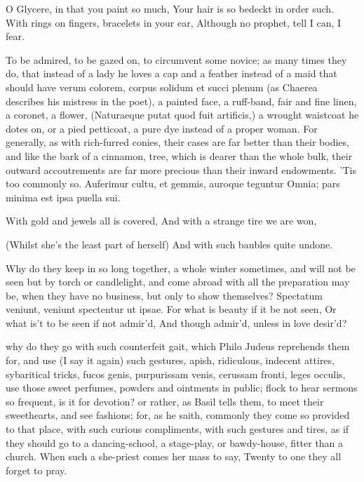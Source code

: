 O Glycere, in that you paint so much,
Your hair is so bedeckt in order such.
With rings on fingers, bracelets in your ear,
Although no prophet, tell I can, I fear.

To be admired, to be gazed on, to circumvent some novice; as many times
they do, that instead of a lady he loves a cap and a feather instead of
a maid that should have verum colorem, corpus solidum et succi plenum
(as Chaerea describes his mistress in the poet), a painted face,
a ruff-band, fair and fine linen, a coronet, a flower,
(Naturaeque putat quod fuit artificis,) a wrought waistcoat he
dotes on, or a pied petticoat, a pure dye instead of a proper woman.
For generally, as with rich-furred conies, their cases are far better
than their bodies, and like the bark of a cinnamon, tree, which is
dearer than the whole bulk, their outward accoutrements are far more
precious than their inward endowments. 'Tis too commonly so.
Auferimur cultu, et gemmis, auroque teguntur
Omnia; pars minima est ipsa puella sui.


With gold and jewels all is covered,
And with a strange tire we are won,

(Whilst she's the least part of herself)
And with such baubles quite undone.

Why do they keep in so long together, a whole winter sometimes, and
will not be seen but by torch or candlelight, and come abroad with all
the preparation may be, when they have no business, but only to show
themselves? Spectatum veniunt, veniunt spectentur ut ipsae.
For what is beauty if it be not seen,
Or what is't to be seen if not admir'd,
And though admir'd, unless in love desir'd?

why do they go with such counterfeit gait, which Philo Judeus
reprehends them for, and use (I say it again) such gestures, apish,
ridiculous, indecent attires, sybaritical tricks, fucos genis,
purpurissam venis, cerussam fronti, leges occulis, \etc{} use those sweet
perfumes, powders and ointments in public; flock to hear sermons so
frequent, is it for devotion? or rather, as Basil tells them, to
meet their sweethearts, and see fashions; for, as he saith, commonly
they come so provided to that place, with such curious compliments,
with such gestures and tires, as if they should go to a dancing-school,
a stage-play, or bawdy-house, fitter than a church.
When such a she-priest comes her mass to say,
Twenty to one they all forget to pray.

